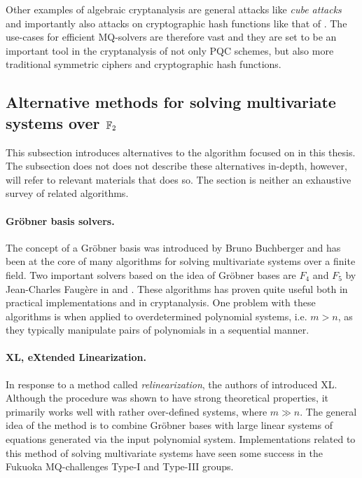 Other examples of algebraic cryptanalysis are general attacks like \textit{cube attacks} \cite{Videau2011} and importantly also attacks on cryptographic hash functions like that of \cite{fse-2011-23547}. The use-cases for efficient MQ-solvers are therefore vast and they are set to be an important tool in the cryptanalysis of not only PQC schemes, but also more traditional symmetric ciphers and cryptographic hash functions. 

\subsection{Alternative methods for solving multivariate systems over $\mathbb{F}_2$}
This subsection introduces alternatives to the algorithm focused on in this thesis. The subsection does not does not describe these alternatives in-depth, however, will refer to relevant materials that does so. The section is neither an exhaustive survey of related algorithms.

\paragraph{Gröbner basis solvers.} The concept of a Gröbner basis was introduced by Bruno Buchberger and has been at the core of many algorithms for solving multivariate systems over a finite field. Two important solvers based on the idea of Gröbner bases are $F_4$ and $F_5$ by Jean-Charles Faugère in \cite{FAUGERE199961} and \cite{10.1145/780506.780516}. These algorithms has proven quite useful both in practical implementations and in cryptanalysis. One problem with these algorithms is when applied to overdetermined polynomial systems, i.e. $m > n$, as they typically manipulate pairs of polynomials in a sequential manner. 

\paragraph{XL, eXtended Linearization.} In response to a method called \textit{relinearization}, the authors of \cite{eurocrypt-2000-2187} introduced XL. Although the procedure was shown to have strong theoretical properties, it primarily works well with rather over-defined systems, where $m \gg n$. The general idea of the method is to combine Gröbner bases with large linear systems of equations generated via the input polynomial system. Implementations related to this method of solving multivariate systems have seen some success in the Fukuoka MQ-challenges Type-I and Type-III groups. 

